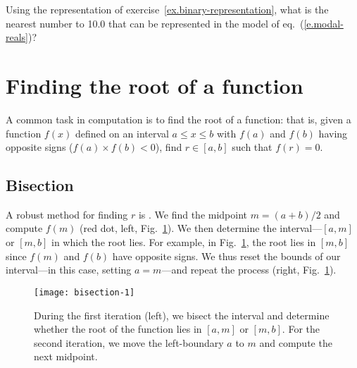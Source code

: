 \begin{exercisebox}
Using the representation of exercise~\ref{ex.binary-representation}, what is the nearest number to 10.0 that can be represented in the model of eq.~(\ref{e.modal-reals})?
\end{exercisebox}

\section{Finding the root of a function}
A common task in computation is to find the root of a function: that is, given a function $f(x)$ defined on an interval $a\le x\le b$ with $f(a)$ and $f(b)$ having opposite signs ($f(a)\times f(b) < 0$), find $r\in[a,b]$ such that $f(r) = 0$.

\subsection{Bisection}
A robust method for finding $r$ is . We find the midpoint $m = (a+b)/2$ and compute $f(m)$ (red dot, left, Fig.~\ref{f.bisection-1}). We then determine the interval---$[a,m]$ or $[m,b]$ in which the root lies. For example, in Fig.~\ref{f.bisection-1}, the root lies in $[m,b]$ since $f(m)$ and $f(b)$ have opposite signs. We thus reset the bounds of our interval---in this case, setting $a=m$---and repeat the process (right, Fig.~\ref{f.bisection-1}).
\begin{figure}
\forcerectofloat
\centering
\texttt{[image: bisection-1]}
\caption[First bisection steps]{During the first iteration (left), we bisect the interval and determine whether the root of the function lies in $[a,m]$ or $[m,b]$.
For the second iteration, we move the left-boundary $a$ to $m$ and compute the next midpoint.
\label{f.bisection-1}}
\end{figure}

